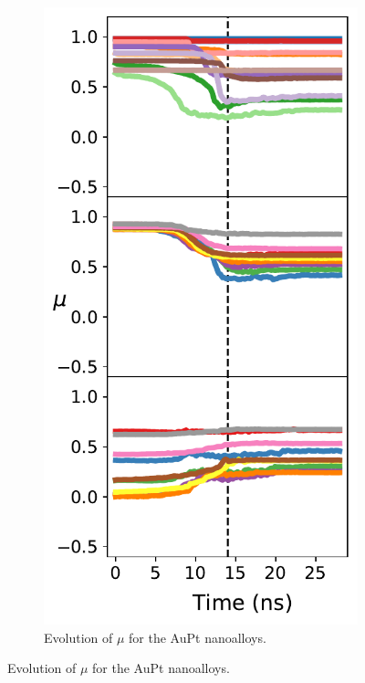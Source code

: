 \begin{figure}
    \centering
\begin{subfigure}{0.39\textwidth}
    \centering
    \smallskip
    \includegraphics[width=\linewidth]{figures/MD/Alloys/Mix_Au-Pt.pdf}
    \caption{Evolution of $\mu$ for the AuPt nanoalloys.}

\end{subfigure}
\end{figure}
